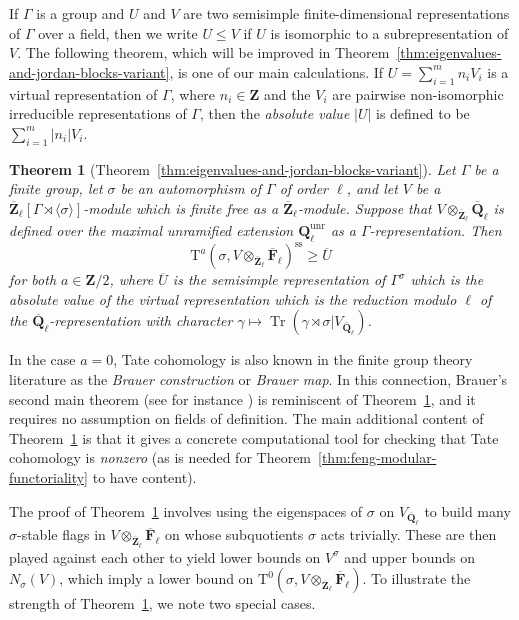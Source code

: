 \documentclass[reqno]{amsart}
\numberwithin{equation}{subsection}
\newcommand{\F}{\mathbf{F}}
\newcommand{\Q}{\mathbf{Q}}
\newcommand{\Z}{\mathbf{Z}}
\newcommand{\ol}[1]{\overline{#1}}
\DeclareMathOperator{\Tr}{Tr}
\DeclareMathOperator{\unr}{unr}
\newcommand{\rT}{\ensuremath{\mathrm{T}}\xspace}
\renewcommand{\ss}{\mathrm{ss}}
\newtheorem{thm}{Theorem}[subsection]
\theoremstyle{remark}
\numberwithin{equation}{subsection}
\numberwithin{figure}{subsection}
\begin{document}
If $\Gamma$ is a group and $U$ and $V$ are two semisimple finite-dimensional representations of $\Gamma$ over a field, then we write $U \leq V$ if $U$ is isomorphic to a subrepresentation of $V$. The following theorem, which will be improved in Theorem~\ref{thm:eigenvalues-and-jordan-blocks-variant}, is one of our main calculations. If $U = \sum_{i=1}^m n_i V_i$ is a virtual representation of $\Gamma$, where $n_i \in \Z$ and the $V_i$ are pairwise non-isomorphic irreducible representations of $\Gamma$, then the \emph{absolute value} $|U|$ is defined to be $\sum_{i=1}^m |n_i| V_i$.

\begin{thm}[Theorem~\ref{thm:eigenvalues-and-jordan-blocks-variant}]\label{thm:intro-tate-lower-bound}
    Let $\Gamma$ be a finite group, let $\sigma$ be an automorphism of $\Gamma$ of order $\ell$, and let $V$ be a $\ol\Z_\ell[\Gamma \rtimes \langle\sigma\rangle]$-module which is finite free as a $\ol\Z_\ell$-module. Suppose that $V \otimes_{\ol\Z_\ell} \ol\Q_\ell$ is defined over the maximal unramified extension $\Q_\ell^{\unr}$ as a $\Gamma$-representation. Then
    \[
    \rT^a(\sigma, V \otimes_{\ol\Z_\ell} \ol\F_\ell)^{\ss} \geq \ol U
    \]
    for both $a \in \Z/2$, where $\ol U$ is the semisimple representation of $\Gamma^\sigma$ which is the absolute value of the virtual representation which is the reduction modulo $\ell$ of the $\ol\Q_\ell$-representation with character $\gamma \mapsto \Tr(\gamma \rtimes \sigma|V_{\ol\Q_\ell})$.
\end{thm}

In the case $a=0$, Tate cohomology is also known in the finite group theory literature as the \emph{Brauer construction} or \emph{Brauer map}. In this connection, Brauer's second main theorem (see for instance \cite[Th\'eor\`eme 4.3]{Dig86b}) is reminiscent of Theorem~\ref{thm:intro-tate-lower-bound}, and it requires no assumption on fields of definition. The main additional content of Theorem~\ref{thm:intro-tate-lower-bound} is that it gives a concrete computational tool for checking that Tate cohomology is \emph{nonzero} (as is needed for Theorem~\ref{thm:feng-modular-functoriality} to have content).

The proof of Theorem~\ref{thm:intro-tate-lower-bound} involves using the eigenspaces of $\sigma$ on $V_{\ol\Q_\ell}$ to build many $\sigma$-stable flags in $V \otimes_{\ol\Z_\ell} \ol\F_\ell$ on whose subquotients $\sigma$ acts trivially. These are then played against each other to yield lower bounds on $V^\sigma$ and upper bounds on $N_\sigma(V)$, which imply a lower bound on $\rT^0(\sigma, V \otimes_{\ol\Z_\ell} \ol\F_\ell)$. To illustrate the strength of Theorem~\ref{thm:intro-tate-lower-bound}, we note two special cases.
\end{document}
